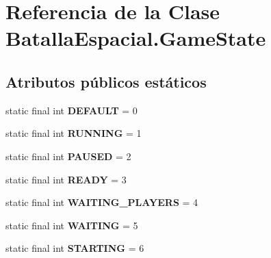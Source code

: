 \hypertarget{classBatallaEspacial_1_1GameState}{
\section{Referencia de la Clase BatallaEspacial.GameState}
\label{classBatallaEspacial_1_1GameState}
}
\subsection*{Atributos públicos estáticos}
\begin{DoxyCompactItemize}
\item 
\hypertarget{classBatallaEspacial_1_1GameState_acedddb7fa63ab67d9223109fff34d4d4}{
static final int {\bfseries DEFAULT} = 0}
\label{classBatallaEspacial_1_1GameState_acedddb7fa63ab67d9223109fff34d4d4}

\item 
\hypertarget{classBatallaEspacial_1_1GameState_a15dea48cde3eb19293b86c18273c88b9}{
static final int {\bfseries RUNNING} = 1}
\label{classBatallaEspacial_1_1GameState_a15dea48cde3eb19293b86c18273c88b9}

\item 
\hypertarget{classBatallaEspacial_1_1GameState_a3e9afe996a600f7f6b60ec7595e79f02}{
static final int {\bfseries PAUSED} = 2}
\label{classBatallaEspacial_1_1GameState_a3e9afe996a600f7f6b60ec7595e79f02}

\item 
\hypertarget{classBatallaEspacial_1_1GameState_a7ce1640efb38d72abdc750630f25b79f}{
static final int {\bfseries READY} = 3}
\label{classBatallaEspacial_1_1GameState_a7ce1640efb38d72abdc750630f25b79f}

\item 
\hypertarget{classBatallaEspacial_1_1GameState_a1334bf51ceec78da3c33cb1fc0fd7879}{
static final int {\bfseries WAITING\_\-PLAYERS} = 4}
\label{classBatallaEspacial_1_1GameState_a1334bf51ceec78da3c33cb1fc0fd7879}

\item 
\hypertarget{classBatallaEspacial_1_1GameState_a7c608dec8d5074fdb45a8b0046184170}{
static final int {\bfseries WAITING} = 5}
\label{classBatallaEspacial_1_1GameState_a7c608dec8d5074fdb45a8b0046184170}

\item 
\hypertarget{classBatallaEspacial_1_1GameState_af12c668f1cc8b4f557d03b1afc8f50ff}{
static final int {\bfseries STARTING} = 6}
\label{classBatallaEspacial_1_1GameState_af12c668f1cc8b4f557d03b1afc8f50ff}


\end{DoxyCompactItemize}
